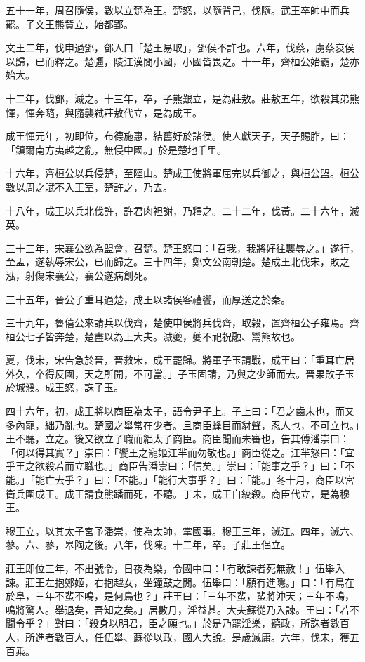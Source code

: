 \begin{pinyinscope}
五十一年，周召隨侯，數以立楚為王。楚怒，以隨背己，伐隨。武王卒師中而兵罷。子文王熊貲立，始都郢。

文王二年，伐申過鄧，鄧人曰「楚王易取」，鄧侯不許也。六年，伐蔡，虜蔡哀侯以歸，已而釋之。楚彊，陵江漢閒小國，小國皆畏之。十一年，齊桓公始霸，楚亦始大。

十二年，伐鄧，滅之。十三年，卒，子熊艱立，是為莊敖。莊敖五年，欲殺其弟熊惲，惲奔隨，與隨襲弒莊敖代立，是為成王。

成王惲元年，初即位，布德施惠，結舊好於諸侯。使人獻天子，天子賜胙，曰：「鎮爾南方夷越之亂，無侵中國。」於是楚地千里。

十六年，齊桓公以兵侵楚，至陘山。楚成王使將軍屈完以兵御之，與桓公盟。桓公數以周之賦不入王室，楚許之，乃去。

十八年，成王以兵北伐許，許君肉袒謝，乃釋之。二十二年，伐黃。二十六年，滅英。

三十三年，宋襄公欲為盟會，召楚。楚王怒曰：「召我，我將好往襲辱之。」遂行，至盂，遂執辱宋公，已而歸之。三十四年，鄭文公南朝楚。楚成王北伐宋，敗之泓，射傷宋襄公，襄公遂病創死。

三十五年，晉公子重耳過楚，成王以諸侯客禮饗，而厚送之於秦。

三十九年，魯僖公來請兵以伐齊，楚使申侯將兵伐齊，取穀，置齊桓公子雍焉。齊桓公七子皆奔楚，楚盡以為上大夫。滅夔，夔不祀祝融、鬻熊故也。

夏，伐宋，宋告急於晉，晉救宋，成王罷歸。將軍子玉請戰，成王曰：「重耳亡居外久，卒得反國，天之所開，不可當。」子玉固請，乃與之少師而去。晉果敗子玉於城濮。成王怒，誅子玉。

四十六年，初，成王將以商臣為太子，語令尹子上。子上曰：「君之齒未也，而又多內寵，絀乃亂也。楚國之舉常在少者。且商臣蜂目而豺聲，忍人也，不可立也。」王不聽，立之。後又欲立子職而絀太子商臣。商臣聞而未審也，告其傅潘崇曰：「何以得其實？」崇曰：「饗王之寵姬江羋而勿敬也。」商臣從之。江羋怒曰：「宜乎王之欲殺若而立職也。」商臣告潘崇曰：「信矣。」崇曰：「能事之乎？」曰：「不能。」「能亡去乎？」曰：「不能。」「能行大事乎？」曰：「能。」冬十月，商臣以宮衛兵圍成王。成王請食熊蹯而死，不聽。丁未，成王自絞殺。商臣代立，是為穆王。

穆王立，以其太子宮予潘崇，使為太師，掌國事。穆王三年，滅江。四年，滅六、蓼。六、蓼，皋陶之後。八年，伐陳。十二年，卒。子莊王侶立。

莊王即位三年，不出號令，日夜為樂，令國中曰：「有敢諫者死無赦！」伍舉入諫。莊王左抱鄭姬，右抱越女，坐鐘鼓之閒。伍舉曰：「願有進隱。」曰：「有鳥在於阜，三年不蜚不鳴，是何鳥也？」莊王曰：「三年不蜚，蜚將沖天；三年不鳴，鳴將驚人。舉退矣，吾知之矣。」居數月，淫益甚。大夫蘇從乃入諫。王曰：「若不聞令乎？」對曰：「殺身以明君，臣之願也。」於是乃罷淫樂，聽政，所誅者數百人，所進者數百人，任伍舉、蘇從以政，國人大說。是歲滅庸。六年，伐宋，獲五百乘。


\end{pinyinscope}
